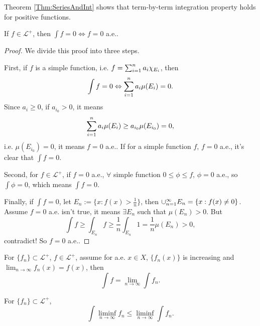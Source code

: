 \begin{rem}
    Theorem \ref{Thm:SeriesAndInt} shows that 
    term-by-term integration property holds 
    for positive functions.
\end{rem}
\begin{prop}
    \label{Prop:PositiveIntZero}
    If $f\in \mathcal{L}^{+}$, then 
    $\int f=0\Leftrightarrow f=0$ a.e..
\end{prop}
\begin{proof}
    We divide this proof into three steps. 

    First, if $f$ is a simple function, i.e. 
    $f=\sum_{i=1}^{n}a_{i}\chi_{E_i}$, then 
    \begin{displaymath}
        \int f=0\Leftrightarrow
        \sum_{i=1}^{n}a_{i}\mu(E_i)=0.
    \end{displaymath}
    Since $a_{i}\ge 0$, if $a_{i_{0}}>0$, 
    it means 
    \begin{displaymath}
        \sum_{i=1}^{n}a_{i}\mu(E_i)
        \ge a_{i_0}\mu(E_{i_0})=0,
    \end{displaymath}
    i.e. $\mu(E_{i_0})=0$, it means $f=0$ a.e..
    If for a simple function $f$, $f=0$ a.e., it's clear that 
    $\int f=0$.

    Second, for $f\in \mathcal{L}^{+}$, if $f=0$ a.e., 
    $\forall$ simple function $0\le\phi\le f$, 
    $\phi=0$ a.e., so $\int\phi=0$, which means $\int f=0$.

    Finally, if $\int f=0$, let $E_{n}:=\{x:f(x)>\frac{1}{n}\}$, 
    then $\cup_{n=1}^{\infty}E_{n}=\{x:f(x)\neq 0\}$. 
    Assume $f=0$ a.e. isn't true, it means $\exists E_{n}$ 
    such that $\mu(E_n)>0$. 
    But 
    \begin{displaymath}
        \int f\ge\int_{E_n}f\ge\frac{1}{n}\int_{E_n}1
        =\frac{1}{n}\mu(E_n)>0,
    \end{displaymath}
    contradict! So $f=0$ a.e..
\end{proof}
\begin{coro}
    For $\{f_{n}\}\subset\mathcal{L}^{+}$, 
    $f\in\mathcal{L}^{+}$, 
    assume for a.e. $x\in X$, $\{f_{n}(x)\}$ is increasing and 
    $\lim_{n\rightarrow\infty}f_{n}(x)=f(x)$, 
    then 
    \begin{displaymath}
        \int f=\lim_{n\rightarrow\infty}\int f_n.
    \end{displaymath}
\end{coro}
\begin{thm}
    \label{Thm:Fatou}
    For $\{f_{n}\}\subset\mathcal{L}^{+}$, 
    \begin{displaymath}
        \int\liminf_{n\rightarrow\infty}f_n\le\liminf_{n\rightarrow\infty}
        \int f_n.
    \end{displaymath}
\end{thm}
